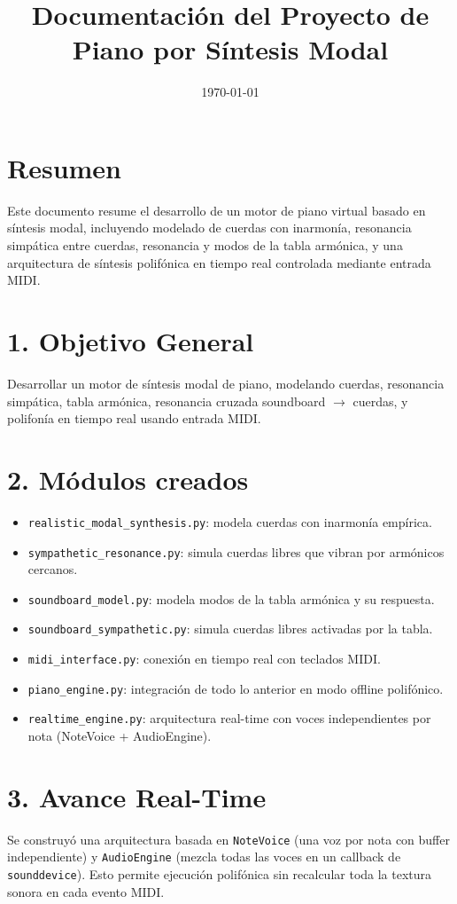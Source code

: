 \documentclass[12pt]{article}
\title{Documentación del Proyecto de Piano por Síntesis Modal}
\date{\today}
\begin{document}
\maketitle

\section*{Resumen}
Este documento resume el desarrollo de un motor de piano virtual basado en síntesis modal, incluyendo modelado de cuerdas con inarmonía, resonancia simpática entre cuerdas, resonancia y modos de la tabla armónica, y una arquitectura de síntesis polifónica en tiempo real controlada mediante entrada MIDI.

\section{1. Objetivo General}
Desarrollar un motor de síntesis modal de piano, modelando cuerdas, resonancia simpática, tabla armónica, resonancia cruzada soundboard $\rightarrow$ cuerdas, y polifonía en tiempo real usando entrada MIDI.

\section{2. Módulos creados}
\begin{itemize}
  \item \texttt{realistic\_modal\_synthesis.py}: modela cuerdas con inarmonía empírica.
  \item \texttt{sympathetic\_resonance.py}: simula cuerdas libres que vibran por armónicos cercanos.
  \item \texttt{soundboard\_model.py}: modela modos de la tabla armónica y su respuesta.
  \item \texttt{soundboard\_sympathetic.py}: simula cuerdas libres activadas por la tabla.
  \item \texttt{midi\_interface.py}: conexión en tiempo real con teclados MIDI.
  \item \texttt{piano\_engine.py}: integración de todo lo anterior en modo offline polifónico.
  \item \texttt{realtime\_engine.py}: arquitectura real-time con voces independientes por nota (NoteVoice + AudioEngine).
\end{itemize}

\section{3. Avance Real-Time}
Se construyó una arquitectura basada en \texttt{NoteVoice} (una voz por nota con buffer independiente) y \texttt{AudioEngine} (mezcla todas las voces en un callback de \texttt{sounddevice}). Esto permite ejecución polifónica sin recalcular toda la textura sonora en cada evento MIDI.
\end{document}
